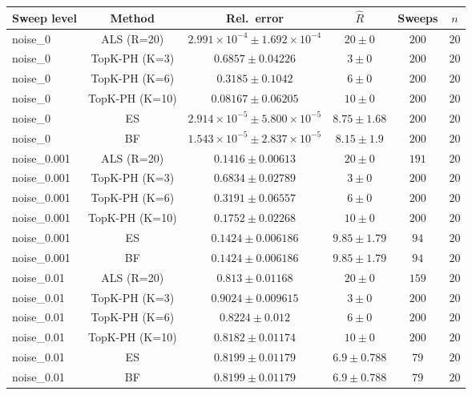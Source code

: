 \begin{longtable}{@{}lccccc@{}}
\toprule
Sweep level & Method & Rel.\ error & \(\hat R\) & Sweeps & \(n\) \\
\midrule
\endhead
noise\_0 & ALS (R=20) & \(2.991{\times}10^{-4} \pm 1.692{\times}10^{-4}\) & \(20 \pm 0\) & \(200\) & \(20\) \\
noise\_0 & TopK-PH (K=3) & \(0.6857 \pm 0.04226\) & \(3 \pm 0\) & \(200\) & \(20\) \\
noise\_0 & TopK-PH (K=6) & \(0.3185 \pm 0.1042\) & \(6 \pm 0\) & \(200\) & \(20\) \\
noise\_0 & TopK-PH (K=10) & \(0.08167 \pm 0.06205\) & \(10 \pm 0\) & \(200\) & \(20\) \\
noise\_0 & ES & \(2.914{\times}10^{-5} \pm 5.800{\times}10^{-5}\) & \(8.75 \pm 1.68\) & \(200\) & \(20\) \\
noise\_0 & BF & \(1.543{\times}10^{-5} \pm 2.837{\times}10^{-5}\) & \(8.15 \pm 1.9\) & \(200\) & \(20\) \\
noise\_0.001 & ALS (R=20) & \(0.1416 \pm 0.00613\) & \(20 \pm 0\) & \(191\) & \(20\) \\
noise\_0.001 & TopK-PH (K=3) & \(0.6834 \pm 0.02789\) & \(3 \pm 0\) & \(200\) & \(20\) \\
noise\_0.001 & TopK-PH (K=6) & \(0.3191 \pm 0.06557\) & \(6 \pm 0\) & \(200\) & \(20\) \\
noise\_0.001 & TopK-PH (K=10) & \(0.1752 \pm 0.02268\) & \(10 \pm 0\) & \(200\) & \(20\) \\
noise\_0.001 & ES & \(0.1424 \pm 0.006186\) & \(9.85 \pm 1.79\) & \(94\) & \(20\) \\
noise\_0.001 & BF & \(0.1424 \pm 0.006186\) & \(9.85 \pm 1.79\) & \(94\) & \(20\) \\
noise\_0.01 & ALS (R=20) & \(0.813 \pm 0.01168\) & \(20 \pm 0\) & \(159\) & \(20\) \\
noise\_0.01 & TopK-PH (K=3) & \(0.9024 \pm 0.009615\) & \(3 \pm 0\) & \(200\) & \(20\) \\
noise\_0.01 & TopK-PH (K=6) & \(0.8224 \pm 0.012\) & \(6 \pm 0\) & \(200\) & \(20\) \\
noise\_0.01 & TopK-PH (K=10) & \(0.8182 \pm 0.01174\) & \(10 \pm 0\) & \(200\) & \(20\) \\
noise\_0.01 & ES & \(0.8199 \pm 0.01179\) & \(6.9 \pm 0.788\) & \(79\) & \(20\) \\
noise\_0.01 & BF & \(0.8199 \pm 0.01179\) & \(6.9 \pm 0.788\) & \(79\) & \(20\) \\

\end{longtable}
